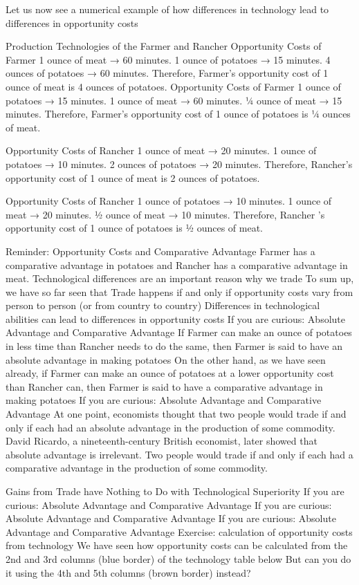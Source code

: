\documentclass[
  letterpaper,
]{book}
\begin{document}
Let us now see a numerical example of how differences in technology lead
to differences in opportunity costs

Production Technologies of the Farmer and Rancher Opportunity Costs of
Farmer 1 ounce of meat → 60 minutes. 1 ounce of potatoes → 15 minutes. 4
ounces of potatoes → 60 minutes. Therefore, Farmer's opportunity cost of
1 ounce of meat is 4 ounces of potatoes. Opportunity Costs of Farmer 1
ounce of potatoes → 15 minutes. 1 ounce of meat → 60 minutes. ¼ ounce of
meat → 15 minutes. Therefore, Farmer's opportunity cost of 1 ounce of
potatoes is ¼ ounces of meat.

Opportunity Costs of Rancher 1 ounce of meat → 20 minutes. 1 ounce of
potatoes → 10 minutes. 2 ounces of potatoes → 20 minutes. Therefore,
Rancher's opportunity cost of 1 ounce of meat is 2 ounces of potatoes.

Opportunity Costs of Rancher 1 ounce of potatoes → 10 minutes. 1 ounce
of meat → 20 minutes. ½ ounce of meat → 10 minutes. Therefore, Rancher
's opportunity cost of 1 ounce of potatoes is ½ ounces of meat.

Reminder: Opportunity Costs and Comparative Advantage Farmer has a
comparative advantage in potatoes and Rancher has a comparative
advantage in meat. Technological differences are an important reason why
we trade To sum up, we have so far seen that Trade happens if and only
if opportunity costs vary from person to person (or from country to
country) Differences in technological abilities can lead to differences
in opportunity costs If you are curious: Absolute Advantage and
Comparative Advantage If Farmer can make an ounce of potatoes in less
time than Rancher needs to do the same, then Farmer is said to have an
absolute advantage in making potatoes On the other hand, as we have seen
already, if Farmer can make an ounce of potatoes at a lower opportunity
cost than Rancher can, then Farmer is said to have a comparative
advantage in making potatoes If you are curious: Absolute Advantage and
Comparative Advantage At one point, economists thought that two people
would trade if and only if each had an absolute advantage in the
production of some commodity. David Ricardo, a nineteenth-century
British economist, later showed that absolute advantage is irrelevant.
Two people would trade if and only if each had a comparative advantage
in the production of some commodity.

Gains from Trade have Nothing to Do with Technological Superiority If
you are curious: Absolute Advantage and Comparative Advantage If you are
curious: Absolute Advantage and Comparative Advantage If you are
curious: Absolute Advantage and Comparative Advantage Exercise:
calculation of opportunity costs from technology We have seen how
opportunity costs can be calculated from the 2nd and 3rd columns (blue
border) of the technology table below But can you do it using the 4th
and 5th columns (brown border) instead?
\end{document}
